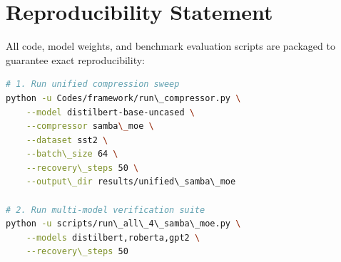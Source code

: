 \section{Reproducibility Statement}
All code, model weights, and benchmark evaluation scripts are packaged to guarantee exact reproducibility:
\begin{lstlisting}[language=bash]
# 1. Run unified compression sweep
python -u Codes/framework/run\_compressor.py \
    --model distilbert-base-uncased \
    --compressor samba\_moe \
    --dataset sst2 \
    --batch\_size 64 \
    --recovery\_steps 50 \
    --output\_dir results/unified\_samba\_moe

# 2. Run multi-model verification suite
python -u scripts/run\_all\_4\_samba\_moe.py \
    --models distilbert,roberta,gpt2 \
    --recovery\_steps 50
\end{lstlisting}
